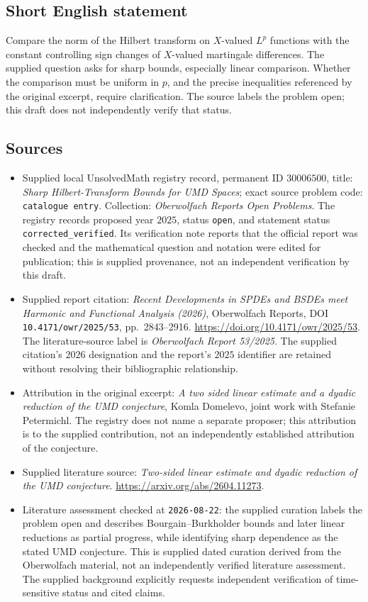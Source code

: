 \documentclass[11pt]{article}
\begin{document}
\subsection{Short English statement}
Compare the norm of the Hilbert transform on \(X\)-valued \(L^p\) functions with the constant controlling sign changes of \(X\)-valued martingale differences. The supplied question asks for sharp bounds, especially linear comparison. Whether the comparison must be uniform in \(p\), and the precise inequalities referenced by the original excerpt, require clarification. The source labels the problem open; this draft does not independently verify that status.
\subsection{Sources}
\begin{itemize}
\item Supplied local UnsolvedMath registry record, permanent ID \(30006500\), title: \emph{Sharp Hilbert-Transform Bounds for UMD Spaces}; exact source problem code: \texttt{catalogue entry}. Collection: \emph{Oberwolfach Reports Open Problems}. The registry records proposed year \(2025\), status \texttt{open}, and statement status \texttt{corrected\_verified}. Its verification note reports that the official report was checked and the mathematical question and notation were edited for publication; this is supplied provenance, not an independent verification by this draft.
\item Supplied report citation: \emph{Recent Developments in SPDEs and BSDEs meet Harmonic and Functional Analysis (2026)}, Oberwolfach Reports, DOI \texttt{10.4171/owr/2025/53}, pp.\ 2843--2916. \url{https://doi.org/10.4171/owr/2025/53}. The literature-source label is \emph{Oberwolfach Report 53/2025}. The supplied citation's \(2026\) designation and the report's \(2025\) identifier are retained without resolving their bibliographic relationship.
\item Attribution in the original excerpt: \emph{A two sided linear estimate and a dyadic reduction of the UMD conjecture}, Komla Domelevo, joint work with Stefanie Petermichl. The registry does not name a separate proposer; this attribution is to the supplied contribution, not an independently established attribution of the conjecture.
\item Supplied literature source: \emph{Two-sided linear estimate and dyadic reduction of the UMD conjecture}. \url{https://arxiv.org/abs/2604.11273}.
\item Literature assessment checked at \texttt{2026-08-22}: the supplied curation labels the problem open and describes Bourgain--Burkholder bounds and later linear reductions as partial progress, while identifying sharp dependence as the stated UMD conjecture. This is supplied dated curation derived from the Oberwolfach material, not an independently verified literature assessment. The supplied background explicitly requests independent verification of time-sensitive status and cited claims.
\end{itemize}
\end{document}
